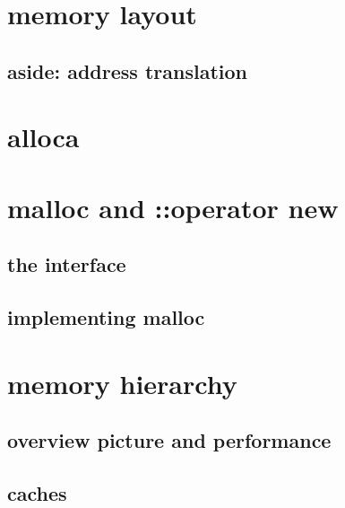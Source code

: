 
\begin{frame}
    \titlepage
\end{frame}

\section{memory layout}




\subsection{aside: address translation}


\section{alloca}



\section{malloc and ::operator new}

\subsection{the interface}



\subsection{implementing malloc}



\section{memory hierarchy}

\subsection{overview picture and performance}



\subsection{caches}

